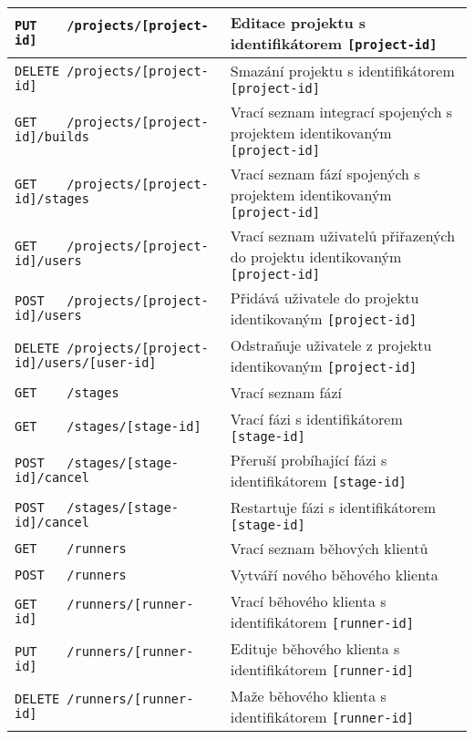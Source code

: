 \begin{sidewaystable}[ht]
\begin{tabular}{|l|l|}
\verb|PUT    /projects/[project-id]|                     & Editace projektu s identifikátorem \verb|[project-id]| \\ \hline
\verb|DELETE /projects/[project-id]|                     & Smazání projektu s identifikátorem \verb|[project-id]| \\ \hline
\verb|GET    /projects/[project-id]/builds|              & Vrací seznam integrací spojených s projektem identikovaným \verb|[project-id]| \\ \hline
\verb|GET    /projects/[project-id]/stages|              & Vrací seznam fází spojených s projektem identikovaným \verb|[project-id]| \\ \hline
\verb|GET    /projects/[project-id]/users|               & Vrací seznam uživatelů přiřazených do projektu identikovaným \verb|[project-id]| \\ \hline
\verb|POST   /projects/[project-id]/users|               & Přidává uživatele do projektu identikovaným \verb|[project-id]| \\ \hline
\verb|DELETE /projects/[project-id]/users/[user-id]|     & Odstraňuje uživatele z projektu identikovaným \verb|[project-id]| \\ \hline
\verb|GET    /stages|                                    & Vrací seznam fází \\ \hline
\verb|GET    /stages/[stage-id]|                         & Vrací fázi s identifikátorem \verb|[stage-id]| \\ \hline
\verb|POST   /stages/[stage-id]/cancel|                  & Přeruší probíhající fázi s identifikátorem \verb|[stage-id]| \\ \hline
\verb|POST   /stages/[stage-id]/cancel|                  & Restartuje fázi s identifikátorem \verb|[stage-id]| \\ \hline
\verb|GET    /runners|                                   & Vrací seznam běhových klientů \\ \hline
\verb|POST   /runners|                                   & Vytváří nového běhového klienta \\ \hline
\verb|GET    /runners/[runner-id]|                       & Vrací běhového klienta s identifikátorem \verb|[runner-id]| \\ \hline
\verb|PUT    /runners/[runner-id]|                       & Edituje běhového klienta s identifikátorem \verb|[runner-id]| \\ \hline
\verb|DELETE /runners/[runner-id]|                       & Maže běhového klienta s identifikátorem \verb|[runner-id]| \\ \hline

\end{tabular}
\end{sidewaystable}
